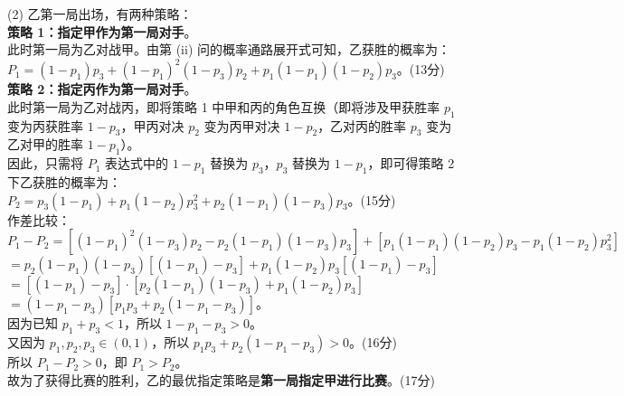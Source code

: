{  (2) 乙第一局出场，有两种策略：\\
  \textbf{策略 1：指定甲作为第一局对手}。\\
  此时第一局为乙对战甲。由第 (ii) 问的概率通路展开式可知，乙获胜的概率为：\\
  \(P_1 = (1-p_1)p_3 + (1-p_1)^2(1-p_3)p_2 + p_1(1-p_1)(1-p_2)p_3\)。\hfill (13分)\\
  \textbf{策略 2：指定丙作为第一局对手}。\\
  此时第一局为乙对战丙，即将策略 1 中甲和丙的角色互换（即将涉及甲获胜率 \(p_1\) 变为丙获胜率 \(1-p_3\)，甲丙对决 \(p_2\) 变为丙甲对决 \(1-p_2\)，乙对丙的胜率 \(p_3\) 变为乙对甲的胜率 \(1-p_1\)）。\\
  因此，只需将 \(P_1\) 表达式中的 \(1-p_1\) 替换为 \(p_3\)，\(p_3\) 替换为 \(1-p_1\)，即可得策略 2 下乙获胜的概率为：\\
  \(P_2 = p_3(1-p_1) + p_1(1-p_2)p_3^2 + p_2(1-p_1)(1-p_3)p_3\)。\hfill (15分)\\
  作差比较：\\
  \(P_1 - P_2 = [ (1-p_1)^2(1-p_3)p_2 - p_2(1-p_1)(1-p_3)p_3 ] + [ p_1(1-p_1)(1-p_2)p_3 - p_1(1-p_2)p_3^2 ]\)\\
  \(= p_2(1-p_1)(1-p_3)[ (1-p_1) - p_3 ] + p_1(1-p_2)p_3[ (1-p_1) - p_3 ]\)\\
  \(= [ (1-p_1) - p_3 ] \cdot [ p_2(1-p_1)(1-p_3) + p_1(1-p_2)p_3 ]\)\\
  \(= (1-p_1-p_3)[ p_1 p_3 + p_2(1-p_1-p_3) ]\)。\\
  因为已知 \(p_1+p_3 < 1\)，所以 \(1-p_1 - p_3 > 0\)。\\
  又因为 \(p_1, p_2, p_3 \in (0,1)\)，所以 \(p_1 p_3 + p_2(1-p_1-p_3) > 0\)。\hfill (16分)\\
  所以 \(P_1 - P_2 > 0\)，即 \(P_1 > P_2\)。\\
  故为了获得比赛的胜利，乙的最优指定策略是\textbf{第一局指定甲进行比赛}。\hfill (17分)%
}
\newcommand{\qEighteenDiagnosis}{\errortag{概率通路径遗漏} 该题难点在于画出比赛走势树状图。许多学生可能漏算第 4 局（全员得 1 分的情况），或者在第二问作差变形时未能提取出公因式 \((1-p_1-p_3)\) 导致无法判断符号。}
\newcommand{\qEighteenTeachingNotes}{强调多局博弈问题的解题思路：1. 列表或画出决策树；2. 准确写出每个节点的得分；3. 代数作差法判断不等式方向。}

